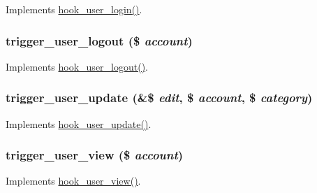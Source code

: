 \label{trigger_8module_a2957541441d3ecd139d7d4e295739c43}
Implements \hyperlink{group__hooks_ga8cce712a39ee6e57bd506b5a0c457d09}{hook\_\-user\_\-login()}. \hypertarget{trigger_8module_a93a000d39a65cd065a881e453d6d95ca}{
\subsubsection[{trigger\_\-user\_\-logout}]{\setlength{\rightskip}{0pt plus 5cm}trigger\_\-user\_\-logout (\$ {\em account})}}
\label{trigger_8module_a93a000d39a65cd065a881e453d6d95ca}
Implements \hyperlink{group__hooks_ga49a4bb63d4b643cf9e3feb2266fe4865}{hook\_\-user\_\-logout()}. \hypertarget{trigger_8module_a316a4118499482b641a29a9dca124d5c}{
\subsubsection[{trigger\_\-user\_\-update}]{\setlength{\rightskip}{0pt plus 5cm}trigger\_\-user\_\-update (\&\$ {\em edit}, \/  \$ {\em account}, \/  \$ {\em category})}}
\label{trigger_8module_a316a4118499482b641a29a9dca124d5c}
Implements \hyperlink{group__hooks_gab71262402336071ef7c3d08f4c36e887}{hook\_\-user\_\-update()}. \hypertarget{trigger_8module_a6c0e4f792bf7612b612e22305d93c6fb}{
\subsubsection[{trigger\_\-user\_\-view}]{\setlength{\rightskip}{0pt plus 5cm}trigger\_\-user\_\-view (\$ {\em account})}}
\label{trigger_8module_a6c0e4f792bf7612b612e22305d93c6fb}
Implements \hyperlink{group__hooks_gaafb9e35d1f82a33918437ad7acf29541}{hook\_\-user\_\-view()}. 